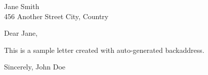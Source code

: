 \documentclass[version=last]{scrlttr2}
\begin{document}
\begin{letter}{ Jane Smith \\ 456 Another Street
City, Country }
\opening{ Dear Jane, }

This is a sample letter created with auto-generated backaddress.

\closing{ Sincerely, John Doe }

\end{letter}
\end{document}
